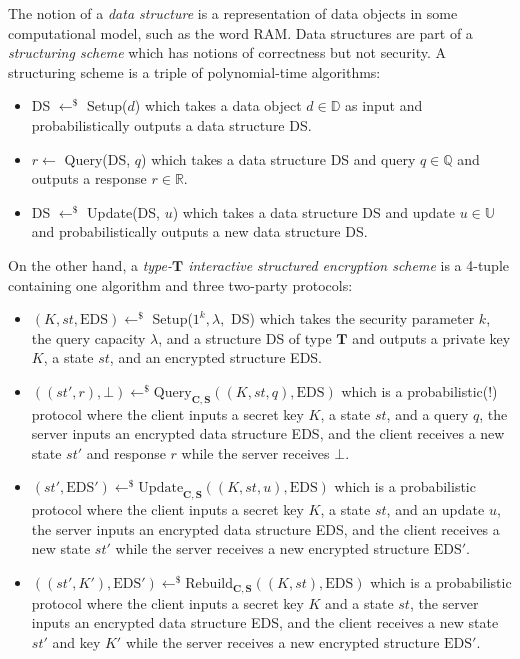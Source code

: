 \documentclass[11pt, pdftex]{article}
\begin{document}
The notion of a {\em data structure} is a representation of data objects in some computational model, such as the word RAM. Data structures are part of a {\em structuring scheme} which has notions of correctness but not security. A structuring scheme is a triple of polynomial-time algorithms:
\begin{itemize}
	\item DS $\gets^\$$ Setup($d$) which takes a data object $d \in \mathbb{D}$ as input and probabilistically outputs a data structure DS.
	\item $r \gets$ Query(DS, $q$) which takes a data structure DS and query $q \in \mathbb{Q}$ and outputs a response $r \in \mathbb{R}$.
	\item DS $\gets^\$$ Update(DS, $u$) which takes a data structure DS and update $u \in \mathbb{U}$ and probabilistically outputs a new data structure DS.
\end{itemize}

On the other hand, a {\em type-$\mathbf{T}$ interactive structured encryption scheme} is a 4-tuple containing one algorithm and three two-party protocols:
\begin{itemize}
	\item $(K,st,\mathrm{EDS}) \gets^\$$ Setup($1^k,\lambda,$ DS) which takes the security parameter $k$, the query capacity $\lambda$, and a structure DS of type $\mathbf{T}$ and outputs a private key $K$, a state $st$, and an encrypted structure EDS.
	\item $((st',r),\bot) \gets^\$ \mathrm{Query}_{\mathbf{C},\mathbf{S}}((K,st,q),\mathrm{EDS})$ which is a probabilistic(!) protocol where the client inputs a secret key $K$, a state $st$, and a query $q$, the server inputs an encrypted data structure EDS, and the client receives a new state $st'$ and response $r$ while the server receives $\bot$.
	\item $(st',\mathrm{EDS}') \gets^\$ \mathrm{Update}_{\mathbf{C},\mathbf{S}}((K,st,u),\mathrm{EDS})$ which is a probabilistic protocol where the client inputs a secret key $K$, a state $st$, and an update $u$, the server inputs an encrypted data structure EDS, and the client receives a new state $st'$ while the server receives a new encrypted structure $\mathrm{EDS}'$.
	\item $((st',K'),\mathrm{EDS}') \gets^\$ \mathrm{Rebuild}_{\mathbf{C},\mathbf{S}}((K,st),\mathrm{EDS})$ which is a probabilistic protocol where the client inputs a secret key $K$ and a state $st$, the server inputs an encrypted data structure EDS, and the client receives a new state $st'$ and key $K'$ while the server receives a new encrypted structure $\mathrm{EDS}'$.
\end{itemize}
\end{document}
